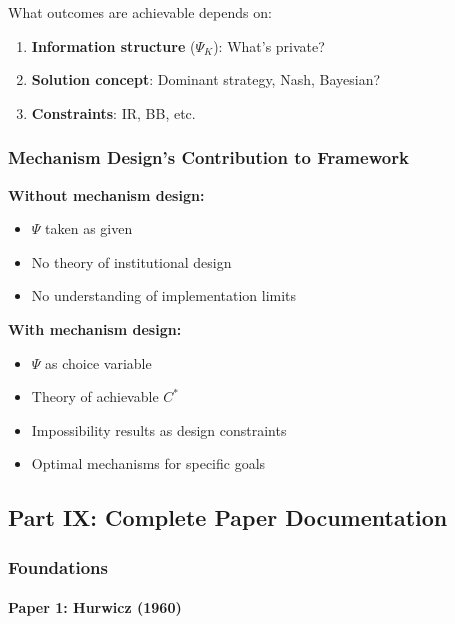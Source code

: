 What outcomes are achievable depends on:
\begin{enumerate}
    \item \textbf{Information structure} ($\Psi_K$): What's private?
    \item \textbf{Solution concept}: Dominant strategy, Nash, Bayesian?
    \item \textbf{Constraints}: IR, BB, etc.
\end{enumerate}

\subsubsection{Mechanism Design's Contribution to Framework}

\textbf{Without mechanism design:}
\begin{itemize}
    \item $\Psi$ taken as given
    \item No theory of institutional design
    \item No understanding of implementation limits
\end{itemize}

\textbf{With mechanism design:}
\begin{itemize}
    \item $\Psi$ as choice variable
    \item Theory of achievable $C^*$
    \item Impossibility results as design constraints
    \item Optimal mechanisms for specific goals
\end{itemize}

\subsection{Part IX: Complete Paper Documentation}

\subsubsection{Foundations}

\paragraph{Paper 1: Hurwicz (1960)}

